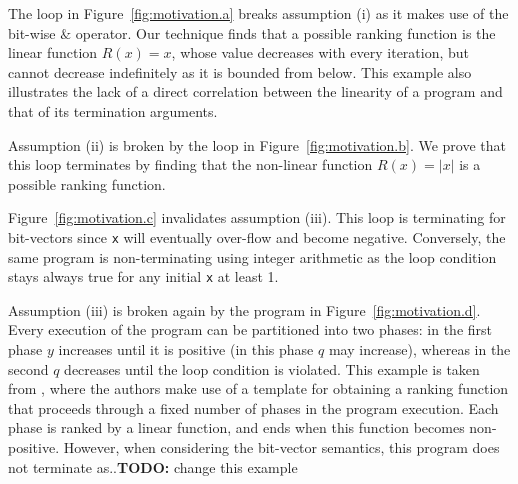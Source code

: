 \documentclass[preprint]{sigplanconf}
\theoremstyle{definition}
\newcommand{\todo}[1]{{\bf TODO:} #1}
\begin{document}


The loop in Figure~\ref{fig:motivation.a} breaks assumption (i) as it makes use of the bit-wise $\&$ operator.
Our technique finds that a possible ranking function is the linear function
$R(x) = x$, whose value decreases with
every iteration, but cannot decrease indefinitely as it is bounded from below.
This example also illustrates the lack of a direct correlation between the linearity of a program and that of its termination arguments.

Assumption (ii) is broken by the loop in Figure~\ref{fig:motivation.b}.
We prove that this loop terminates by finding that the non-linear function $R(x) = |x|$ is a possible ranking function.

Figure~\ref{fig:motivation.c} invalidates assumption (iii). 
This loop is  terminating for bit-vectors since \texttt{x}
will eventually over-flow and become negative. Conversely, the same program is non-terminating using integer
arithmetic as the loop condition stays always true for any initial \texttt{x} at least 1.

Assumption (iii) is broken again by the program in Figure~\ref{fig:motivation.d}. Every execution of the program can be partitioned into two phases: 
in the first phase $y$ increases until it is positive (in this phase $q$ may increase), whereas in the second $q$ decreases until the loop condition is violated. 
This example is taken from \cite{DBLP:conf/tacas/LeikeH14}, where the authors make use of a template for obtaining a ranking function that proceeds
through a fixed number of phases in the program execution. Each phase is ranked by a linear function, and ends when this function becomes non-positive.
However, when considering the bit-vector semantics, this program does not terminate as..\todo{change this example}
\end{document}
